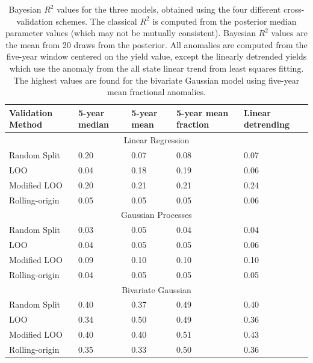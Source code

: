 \documentclass[12pt]{iopart}
\begin{document}
\begin{table}[]
\small
\centering
\caption{Bayesian $R^2$ values for the three models, obtained using the four different cross-validation schemes. The classical $R^2$ is computed from the posterior median parameter values (which may not be mutually consistent). Bayesian $R^2$ values are the mean from 20 draws from the posterior. All anomalies are computed from the five-year window centered on the yield value, except the linearly detrended yields which use the anomaly from the all state linear trend from least squares fitting. The highest values are found for the bivariate Gaussian model using five-year mean fractional anomalies.}
\label{table:cv_results}
\vskip 0.15in
\begin{tabular}{l llll}
\hline
Validation Method     & 5-year median         & 5-year mean          & 5-year mean fraction  & Linear detrending   \\ \hline

\multicolumn{5}{c}{Linear Regression}   \\ \hline
Random Split          & 0.20                  & 0.07                 & 0.08                  &  0.07  \\
LOO                   & 0.04                  & 0.18                 & 0.19                  &  0.06  \\
Modified LOO          & 0.20                  & 0.21                 & 0.21                  &  0.24  \\
Rolling-origin        & 0.05                  & 0.05                 & 0.05                  &  0.06  \\ \hline
\multicolumn{5}{c}{Gaussian Processes}   \\ \hline
Random Split          & 0.03                  & 0.05                 & 0.04                  &  0.04 \\
LOO                   & 0.04                  & 0.05                 & 0.05                  &  0.06 \\
Modified LOO          & 0.09                  & 0.10                 & 0.10                  &  0.10 \\
Rolling-origin        & 0.04                  & 0.05                 & 0.05                  &  0.05 \\ \hline
\multicolumn{5}{c}{Bivariate Gaussian} \\ \hline
Random Split          & 0.40                  & 0.37                 & 0.49                  &  0.40 \\
LOO                   & 0.34                  & 0.50                 & 0.49                  &  0.36 \\
Modified LOO          & 0.40                  & 0.40                 & 0.51                  &  0.43 \\
Rolling-origin        & 0.35                  & 0.33                 & 0.50                  &  0.36 \\ \hline
\end{tabular}
\end{table}
\end{document}
